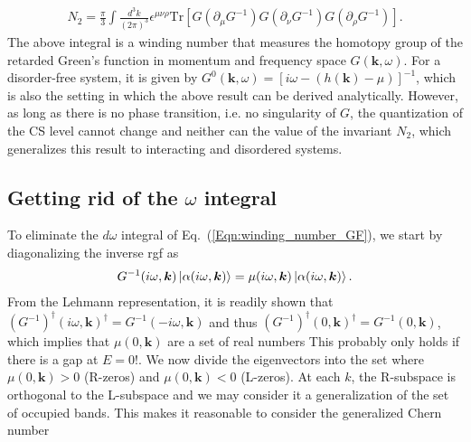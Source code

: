\documentclass[english]{scrartcl}
\newcommand{\mr}{\mathrm}
\newcommand{\eq}[1]{Eq.~(\ref{#1})}
\begin{document}
\begin{align}
N_2 = \frac{\pi}{3} \int \frac{d^3 k}{(2\pi)^3} \epsilon^{\mu \nu \rho} \mr{Tr} [G (\partial_\mu G^{-1}) G (\partial_\nu G^{-1}) G (\partial_\rho G^{-1})]. \label{Eqn:winding_number_GF}
\end{align}
The above integral is a winding number that measures the homotopy group of the retarded Green's function in momentum and frequency space $G(\bm k, \omega)$. For a disorder-free system, it is given by $G^0(\bm k, \omega) = [i \omega - (h(\bm k) - \mu)]^{-1}$, which is also the setting in which the above result can be derived analytically. However, as long as there is no phase transition, i.e. no singularity of $G$, the quantization of the CS level cannot change and neither can the value of the invariant $N_2$, which generalizes this result to interacting and disordered systems.  

\subsection{Getting rid of the $\omega$ integral}
To eliminate the $d \omega$ integral of \eq{Eqn:winding_number_GF}, we start by diagonalizing the inverse \gls{rgf} as 
\begin{align*}
G^{-1}(i \omega, \bm k) \ket{\alpha(i \omega, \bm k)} = \mu(i \omega, \bm k) \ket{\alpha(i \omega, \bm k)}.
\end{align*}
From the Lehmann representation, it is readily shown that $(G^{-1})^\dagger(i \omega, \bm k )^\dagger = G^{-1}(-i \omega, \bm k )$ and thus $(G^{-1})^\dagger(0, \bm k )^\dagger = G^{-1}(0, \bm k)$, which implies that $\mu(0, \bm k)$ are a set of real numbers {\color{red} This probably only holds if there is a gap at $E = 0$!}. We now divide the eigenvectors into the set where $\mu(0, \bm k) > 0$ (R-zeros) and $\mu(0, \bm k) < 0$ (L-zeros). At each $k$, the R-subspace is orthogonal to the L-subspace and we may consider it a generalization of the set of occupied bands. This makes it reasonable to consider the generalized Chern number 
\end{document}
